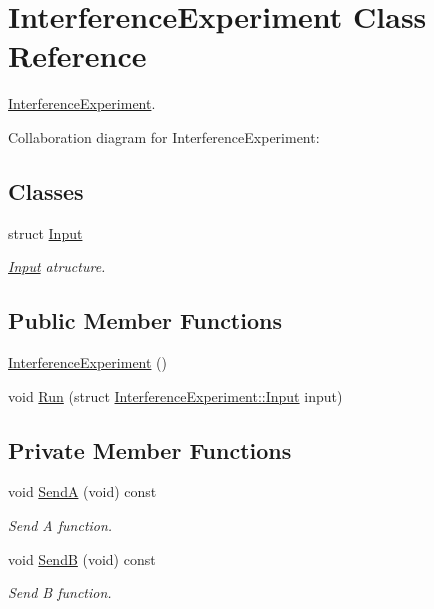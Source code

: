 \hypertarget{classInterferenceExperiment}{}\section{Interference\+Experiment Class Reference}
\label{classInterferenceExperiment}


\hyperlink{classInterferenceExperiment}{Interference\+Experiment}.  




Collaboration diagram for Interference\+Experiment\+:
\subsection*{Classes}
\begin{DoxyCompactItemize}
\item 
struct \hyperlink{structInterferenceExperiment_1_1Input}{Input}
\begin{DoxyCompactList}\small\item\em \hyperlink{structInterferenceExperiment_1_1Input}{Input} atructure. \end{DoxyCompactList}\end{DoxyCompactItemize}
\subsection*{Public Member Functions}
\begin{DoxyCompactItemize}
\item 
\hyperlink{classInterferenceExperiment_aee21bb8de20e5363a217e869279f7834}{Interference\+Experiment} ()
\item 
void \hyperlink{classInterferenceExperiment_ae31524d224c311c36d8b1dd5fcc9f269}{Run} (struct \hyperlink{structInterferenceExperiment_1_1Input}{Interference\+Experiment\+::\+Input} input)
\end{DoxyCompactItemize}
\subsection*{Private Member Functions}
\begin{DoxyCompactItemize}
\item 
void \hyperlink{classInterferenceExperiment_a00ae0f5dac9b45b1175d5c6572013332}{SendA} (void) const 
\begin{DoxyCompactList}\small\item\em Send A function. \end{DoxyCompactList}\item 
void \hyperlink{classInterferenceExperiment_a8e3713c24b3231831e6fcb347e568df8}{SendB} (void) const 
\begin{DoxyCompactList}\small\item\em Send B function. \end{DoxyCompactList}\end{DoxyCompactItemize}
